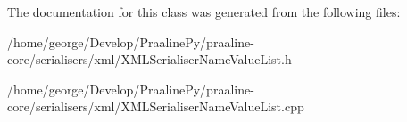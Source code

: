 The documentation for this class was generated from the following files\+:\begin{DoxyCompactItemize}
\item 
/home/george/\+Develop/\+Praaline\+Py/praaline-\/core/serialisers/xml/X\+M\+L\+Serialiser\+Name\+Value\+List.\+h\item 
/home/george/\+Develop/\+Praaline\+Py/praaline-\/core/serialisers/xml/X\+M\+L\+Serialiser\+Name\+Value\+List.\+cpp\end{DoxyCompactItemize}
